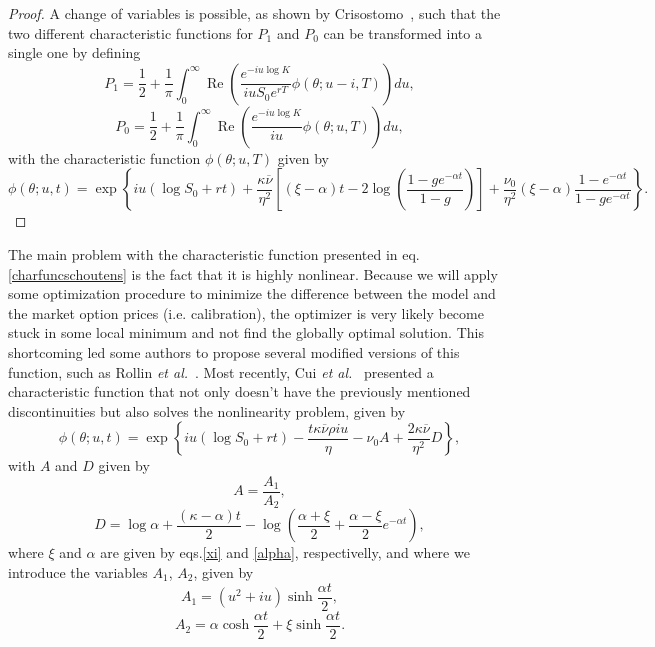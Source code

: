 \begin{proof}
A change of variables is possible, as shown by Crisostomo~\cite{Crisostomo}, such that the two different characteristic functions for $P_1$ and $P_0$ can be transformed into a single one by defining
\begin{equation}
P_1=\frac{1}{2}+\frac{1}{\pi}\int_0^\infty\operatorname{Re}\left(\frac{e^{-iu\log K}}{iuS_0e^{rT}}\phi(\theta;u-i,T)\right)du,
\end{equation}
\begin{equation}
P_0=\frac{1}{2}+\frac{1}{\pi}\int_0^\infty\operatorname{Re}\left(\frac{e^{-iu\log K}}{iu}\phi(\theta;u,T)\right)du,
\end{equation}
\noindent with the characteristic function $\phi(\theta;u,T)$ given by
\begin{equation}
\phi(\theta;u,t)=\exp\left\{iu\left(\log S_0+rt\right)+\frac{\kappa\overline{\nu}}{\eta^2}\left[\left(\xi-\alpha\right)t-2\log\left(\frac{1-ge^{-\alpha t}}{1-g}\right)\right]+\frac{\nu_0}{\eta^2}\left(\xi-\alpha\right)\frac{1-e^{-\alpha t}}{1-ge^{-\alpha t}}\right\}.
\end{equation}

\end{proof}



The main problem with the characteristic function presented in eq.\eqref{charfuncschoutens} is the fact that it is highly nonlinear. Because we will apply some optimization procedure to minimize the difference between the model and the market option prices (i.e. calibration), the optimizer is very likely become stuck in some local minimum and not find the globally optimal solution.
This shortcoming led some authors to propose several modified versions of this function, such as Rollin \textit{et al.}~\cite{Rollin}. Most recently, Cui \textit{et al.}~\cite{Cui} presented a characteristic function that not only doesn't have the previously mentioned discontinuities but also solves the nonlinearity problem, given by
\begin{equation}
\phi(\theta;u,t)=\exp\left\{iu\left(\log S_0+rt\right)-\frac{t\kappa\overline{\nu}\rho iu}{\eta}-\nu_0A+\frac{2\kappa\overline{\nu}}{\eta^2}D\right\},
\end{equation}
\noindent with $A$ and $D$ given by
\begin{equation}
A=\frac{A_1}{A_2},
\end{equation}
\begin{equation}
D=\log \alpha+\frac{(\kappa-\alpha) t}{2}-\log\left(\frac{\alpha+\xi}{2}+\frac{\alpha-\xi}{2}e^{-\alpha t}\right),
\end{equation}
\noindent where $\xi$ and $\alpha$ are given by eqs.\eqref{xi} and \eqref{alpha}, respectivelly, and where we introduce the variables $A_1$, $A_2$, given by
\begin{equation}
A_1=(u^2+iu)\sinh\frac{\alpha t}{2},
\end{equation}
\begin{equation}
A_2=\alpha\cosh\frac{\alpha t}{2}+\xi\sinh\frac{\alpha t}{2}.
\end{equation}

